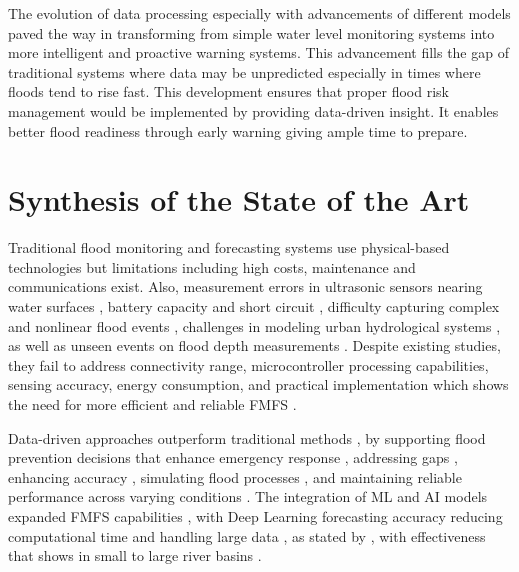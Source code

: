\documentclass{research}
\begin{document}
The evolution of data processing especially with advancements of different models paved the way in transforming from simple water level monitoring systems into more intelligent and proactive warning systems. This advancement fills the gap of traditional systems where data may be unpredicted especially in times where floods tend to rise fast. This development ensures that proper flood risk management would be implemented by providing data-driven insight. It enables better flood readiness through early warning giving ample time to prepare.

\section{Synthesis of the State of the Art}

Traditional flood monitoring and forecasting systems use physical-based technologies \cite{tao2024review,bukhari2025review,dondang2021design,tolentino2022real} but limitations including high costs, maintenance and communications exist. Also, measurement errors in ultrasonic sensors nearing water surfaces \cite{te2024smart}, battery capacity and short circuit \cite{zhao2025water}, difficulty capturing complex and nonlinear flood events \cite{linus2024performance}, challenges in modeling urban hydrological systems \cite{ye2025capturing}, as well as unseen events on flood depth measurements \cite{liu2025comprehensive}. Despite existing studies, they fail to address connectivity range, microcontroller processing capabilities, sensing accuracy, energy consumption, and practical implementation which shows the need for more efficient and reliable FMFS \cite{zakaria2023development}.

Data-driven approaches outperform traditional methods \cite{an2025hybrid}, by supporting flood prevention decisions \cite{aldhafiri2025leveraging,xu2024hybrid} that enhance emergency response \cite{yi2024reservoir}, addressing gaps \cite{rathnasiri2023datadriven}, enhancing accuracy \cite{aravamudan2025superresolution}, simulating flood processes \cite{tang2023flood}, and maintaining reliable performance across varying conditions \cite{asif2025review}. The integration of ML and AI models expanded FMFS capabilities \cite{chiang2024efficient,liu2024generative}, with Deep Learning forecasting accuracy \cite{kuhaneswaran2025evolution,ni2024datadriven} reducing computational time \cite{cache2024enhancing,mou2025ai} and handling large data \cite{ghorpade2021flood}, as stated by \cite{anik2025evolution,lou2026highly,chafjiri2024enhancing}, with effectiveness that shows in small to large river basins \cite{palash2024datadriven,okuno2021practical}.
\end{document}
